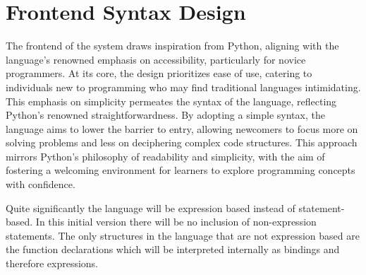 \documentclass{l4proj}
\begin{document}
\section{Frontend Syntax Design} \label{sec:frontend-syntax-design}

The frontend of the system draws inspiration from Python, aligning with the language's renowned emphasis on accessibility, particularly for novice programmers.
At its core, the design prioritizes ease of use, catering to individuals new to programming who may find traditional languages intimidating.
This emphasis on simplicity permeates the syntax of the language, reflecting Python's renowned straightforwardness.
By adopting a simple syntax, the language aims to lower the barrier to entry, allowing newcomers to focus more on solving problems and less on deciphering complex code structures.
This approach mirrors Python's philosophy of readability and simplicity\citep{Peters_2004}, with the aim of fostering a welcoming environment for learners to explore programming concepts with confidence.

Quite significantly the language will be expression based instead of statement-based.
In this initial version there will be no inclusion of non-expression statements.
The only structures in the language that are not expression based are the function declarations which will be interpreted internally as bindings and therefore expressions.


\end{document}
